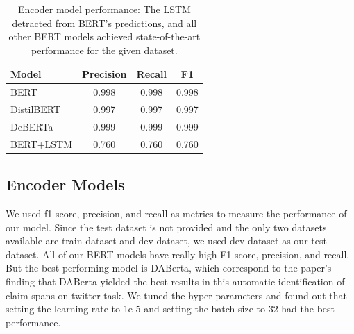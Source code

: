 \documentclass[11pt]{article}
\begin{document}


\begin{table}[]
\begin{tabular}{l c c c}
\hline
\textbf{Model} & \textbf{Precision} & \textbf{Recall} & \textbf{F1}\\
\hline
BERT & 0.998 & 0.998 & 0.998 \\
DistilBERT & 0.997 & 0.997 & 0.997 \\
DeBERTa & 0.999 & 0.999 & 0.999 \\
BERT+LSTM & 0.760 & 0.760 & 0.760 \\
\hline
\end{tabular}

\caption{Encoder model performance: The LSTM detracted from BERT's predictions, and all other BERT models achieved state-of-the-art performance for the given dataset.}
\label{tab encoder: general}
\end{table}

\subsection{Encoder Models}
We used f1 score, precision, and recall as metrics to measure the performance of our model. Since the test dataset is not provided and the only two datasets available are train dataset and dev dataset, we used dev dataset as our test dataset. All of our BERT models have really high F1 score, precision, and recall. But the best performing model is DABerta, which correspond to the paper’s finding that DABerta yielded the best results in this automatic identification of claim spans on twitter task. We tuned the hyper parameters and found out that setting the learning rate to 1e-5 and setting the batch size to 32 had the best performance.
\end{document}

